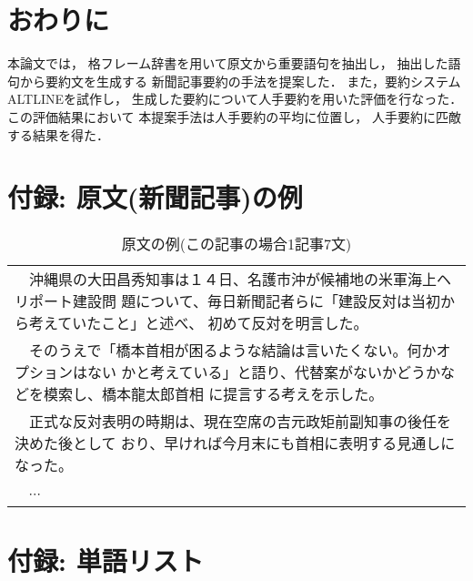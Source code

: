 \section{おわりに}

本論文では，
格フレーム辞書を用いて原文から重要語句を抽出し，
抽出した語句から要約文を生成する
新聞記事要約の手法を提案した．
また，要約システムALTLINEを試作し，
生成した要約について人手要約を用いた評価を行なった．
この評価結果において 本提案手法は人手要約の平均に位置し，
人手要約に匹敵する結果を得た．






\clearpage
\appendix

\section{付録: 原文(新聞記事)の例}
\label{app:article}

\begin{table}[!h]
\caption{原文の例(この記事の場合1記事7文)}
\vspace{1mm}
\begin{center}
\begin{tabular}{p{12cm}}
\hline
　沖縄県の大田昌秀知事は１４日、名護市沖が候補地の米軍海上ヘリポート建設問
題について、毎日新聞記者らに「建設反対は当初から考えていたこと」と述べ、
初めて反対を明言した。\\
　そのうえで「橋本首相が困るような結論は言いたくない。何かオプションはない
かと考えている」と語り、代替案がないかどうかなどを模索し、橋本龍太郎首相
に提言する考えを示した。\\
　正式な反対表明の時期は、現在空席の吉元政矩前副知事の後任を決めた後として
おり、早ければ今月末にも首相に表明する見通しになった。\\
　$\cdots$ \\
\hline
\end{tabular}
\end{center}
\end{table}


\section{付録: 単語リスト}
\label{app:list}

